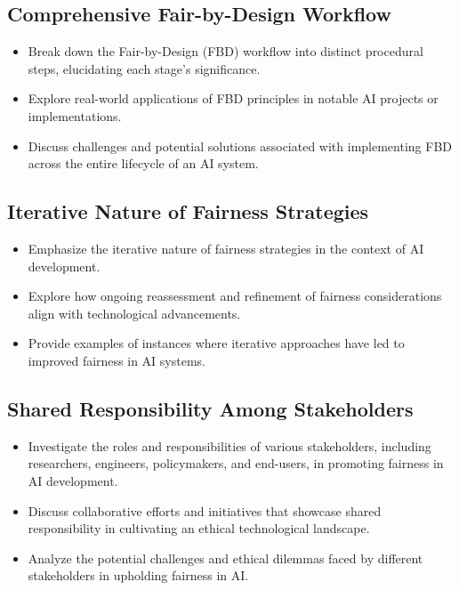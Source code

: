 \subsection*{Comprehensive Fair-by-Design Workflow}

\begin{itemize}[label=--]
    \item Break down the Fair-by-Design (FBD) workflow into distinct procedural steps, elucidating each stage's significance.
    \item Explore real-world applications of FBD principles in notable AI projects or implementations.
    \item Discuss challenges and potential solutions associated with implementing FBD across the entire lifecycle of an AI system.
\end{itemize}

\subsection*{Iterative Nature of Fairness Strategies}

\begin{itemize}[label=--]
    \item Emphasize the iterative nature of fairness strategies in the context of AI development.
    \item Explore how ongoing reassessment and refinement of fairness considerations align with technological advancements.
    \item Provide examples of instances where iterative approaches have led to improved fairness in AI systems.
\end{itemize}

\subsection*{Shared Responsibility Among Stakeholders}

\begin{itemize}[label=--]
    \item Investigate the roles and responsibilities of various stakeholders, including researchers, engineers, policymakers, and end-users, in promoting fairness in AI development.
    \item Discuss collaborative efforts and initiatives that showcase shared responsibility in cultivating an ethical technological landscape.
    \item Analyze the potential challenges and ethical dilemmas faced by different stakeholders in upholding fairness in AI.
\end{itemize}

